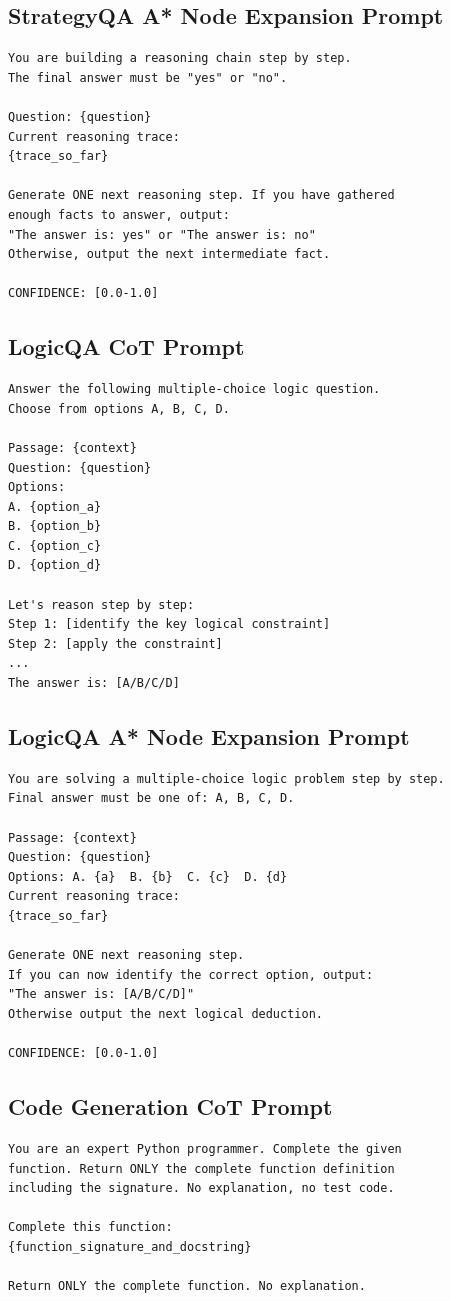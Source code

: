 \documentclass{article}
\begin{document}
\subsection{StrategyQA A* Node Expansion Prompt}
\begin{verbatim}
You are building a reasoning chain step by step.
The final answer must be "yes" or "no".

Question: {question}
Current reasoning trace:
{trace_so_far}

Generate ONE next reasoning step. If you have gathered
enough facts to answer, output:
"The answer is: yes" or "The answer is: no"
Otherwise, output the next intermediate fact.

CONFIDENCE: [0.0-1.0]
\end{verbatim}

\subsection{LogicQA CoT Prompt}
\begin{verbatim}
Answer the following multiple-choice logic question.
Choose from options A, B, C, D.

Passage: {context}
Question: {question}
Options:
A. {option_a}
B. {option_b}
C. {option_c}
D. {option_d}

Let's reason step by step:
Step 1: [identify the key logical constraint]
Step 2: [apply the constraint]
...
The answer is: [A/B/C/D]
\end{verbatim}

\subsection{LogicQA A* Node Expansion Prompt}
\begin{verbatim}
You are solving a multiple-choice logic problem step by step.
Final answer must be one of: A, B, C, D.

Passage: {context}
Question: {question}
Options: A. {a}  B. {b}  C. {c}  D. {d}
Current reasoning trace:
{trace_so_far}

Generate ONE next reasoning step.
If you can now identify the correct option, output:
"The answer is: [A/B/C/D]"
Otherwise output the next logical deduction.

CONFIDENCE: [0.0-1.0]
\end{verbatim}

\subsection{Code Generation CoT Prompt}
\begin{verbatim}
You are an expert Python programmer. Complete the given
function. Return ONLY the complete function definition
including the signature. No explanation, no test code.

Complete this function:
{function_signature_and_docstring}

Return ONLY the complete function. No explanation.
\end{verbatim}
\end{document}
